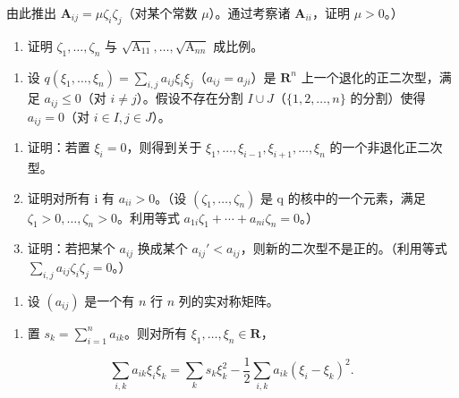 由此推出 \(\mathbf{A}_{ij} = \mu \zeta_i\zeta_j\)（对某个常数 \(\mu\)）。通过考察诸 \(\mathbf{A}_{ii}\)，证明 \(\mu > 0\)。）

\begin{enumerate}
\def\labelenumi{\alph{enumi})}
\setcounter{enumi}{2}
\tightlist
\item
  证明 \(\zeta_1, \ldots, \zeta_n\) 与 \(\sqrt{\mathrm{A}_{11}}, \ldots, \sqrt{\mathrm{A}_{nn}}\) 成比例。
\end{enumerate}

\begin{enumerate}
\def\labelenumi{\arabic{enumi})}
\setcounter{enumi}{6}
\tightlist
\item
  设 \(q(\xi_1, \ldots, \xi_n) = \sum_{i,j} a_{ij} \xi_i \xi_j\)（\(a_{ij} = a_{ji}\)）是 \(\mathbf{R}^n\) 上一个退化的正二次型，满足 \(a_{ij} \leqslant 0\)（对 \(i \neq j\)）。假设不存在分割 \(I \cup J\)（\(\{1, 2, \ldots, n\}\) 的分割）使得 \(a_{ij} = 0\)（对 \(i \in I, j \in J\)）。
\end{enumerate}

\begin{enumerate}
\def\labelenumi{\alph{enumi})}
\item
  证明：若置 \(\xi_{i}=0\)，则得到关于 \(\xi_{1},\ldots,\xi_{i-1},\xi_{i+1},\ldots,\xi_{n}\) 的一个非退化正二次型。
\item
  证明对所有 i 有 \(a_{ii} > 0\)。（设 \((\zeta_{1}, \ldots, \zeta_{n})\) 是 q 的核中的一个元素，满足 \(\zeta_{1} > 0, \ldots, \zeta_{n} > 0\)。利用等式 \(a_{1i}\zeta_{1} + \cdots + a_{ni}\zeta_{n} = 0\)。）
\item
  证明：若把某个 \(a_{ij}\) 换成某个 \(a_{ij}' < a_{ij}\)，则新的二次型不是正的。（利用等式 \(\sum_{i,j} a_{ij} \zeta_i \zeta_j = 0\)。）
\end{enumerate}

\begin{enumerate}
\def\labelenumi{\arabic{enumi})}
\setcounter{enumi}{7}
\tightlist
\item
  设 \((a_{ij})\) 是一个有 \(n\) 行 \(n\) 列的实对称矩阵。
\end{enumerate}

\begin{enumerate}
\def\labelenumi{\alph{enumi})}
\tightlist
\item
  置 \(s_k = \sum_{i=1}^{n} a_{ik}\)。则对所有 \(\xi_1, \ldots, \xi_n \in \mathbf{R}\)，
\end{enumerate}

\[
\sum_ {i, k} a _ {i k} \xi_ {i} \xi_ {k} = \sum_ {k} s _ {k} \xi_ {k} ^ {2} - \frac {1}{2} \sum_ {i, k} a _ {i k} (\xi_ {i} - \xi_ {k}) ^ {2}.
\]

